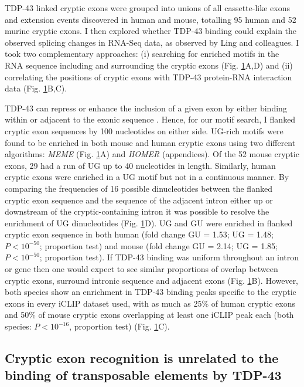 \begin{figure}[h!]
	\label{fig:cryptic_motifs}
\end{figure}


TDP-43 linked cryptic exons were grouped into unions of all cassette-like exons and extension events discovered in human and mouse, totalling 95 human and 52 murine cryptic exons. I then explored whether TDP-43 binding could explain the observed splicing changes in RNA-Seq data, as observed by Ling and colleagues. I took two complementary approaches: (i) searching for enriched motifs in the RNA sequence including and surrounding the cryptic exons (Fig. \ref{fig:cryptic_motifs}A,D) and (ii) correlating the positions of cryptic exons with TDP-43 protein-RNA interaction data (Fig. \ref{fig:cryptic_motifs}B,C).

TDP-43 can repress or enhance the inclusion of a given exon by either binding within or adjacent to the exonic sequence \citep{Tollervey2011}. Hence, for our motif search, I flanked cryptic exon sequences by 100 nucleotides on either side. UG-rich motifs were found to be enriched in both mouse and human cryptic exons using two different algorithms: \emph{MEME} (Fig. \ref{fig:cryptic_motifs}A) and \emph{HOMER} (appendices). Of the 52 mouse cryptic exons, 29 had a run of UG up to 40 nucleotides in length. Similarly, human cryptic exons were enriched in a UG motif but not in a continuous manner. By comparing  the frequencies of  16 possible dinucleotides between the flanked cryptic exon sequence and the sequence of the adjacent intron either up or downstream of the cryptic-containing intron it was possible to resolve the enrichment of UG dinucleotides (Fig. \ref{fig:cryptic_motifs}D). UG and GU were enriched in flanked cryptic exon sequence in both human (fold change GU = 1.53; UG = 1.48; $P < 10^{-50}$; proportion test) and mouse (fold change GU = 2.14; UG = 1.85; $P < 10^{-50}$; proportion test). 
If TDP-43 binding was uniform throughout an intron or gene then one would expect to see similar proportions of overlap between cryptic exons, surround intronic sequence and adjacent exons (Fig. \ref{fig:cryptic_motifs}B). However, both species show an enrichment in TDP-43 binding peaks specific to the cryptic exons in every iCLIP dataset used, with as much as 25\% of human cryptic exons and 50\% of mouse cryptic exons overlapping at least one iCLIP peak each (both species: $P < 10^{-16}$, proportion test) (Fig. \ref{fig:cryptic_motifs}C). 



\subsection{Cryptic exon recognition is unrelated to the binding of transposable elements by TDP-43}

